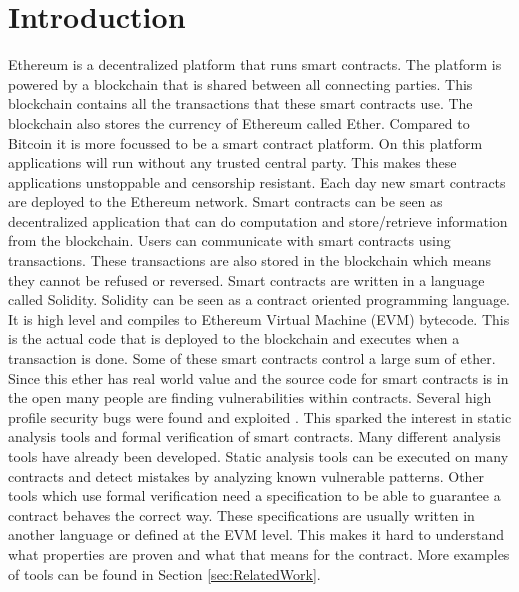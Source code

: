 \documentclass[a4paper]{article}
\begin{document}
\newpage
\tableofcontents
\newpage

\section{Introduction}
Ethereum is a decentralized platform that runs smart contracts. The platform is powered by a blockchain that is shared between all connecting parties. This blockchain contains all the transactions that these smart contracts use. The blockchain also stores the currency of Ethereum called Ether. Compared to Bitcoin it is more focussed to be a smart contract platform. On this platform applications will run without any trusted central party. This makes these applications unstoppable and censorship resistant. Each day new smart contracts are deployed to the Ethereum network. Smart contracts can be seen as decentralized application that can do computation and store/retrieve information from the blockchain. Users can communicate with smart contracts using transactions. These transactions are also stored in the blockchain which means they cannot be refused or reversed. Smart contracts are written in a language called Solidity. Solidity can be seen as a contract oriented programming language. It is high level and compiles to Ethereum Virtual Machine (EVM) bytecode. This is the actual code that is deployed to the blockchain and executes when a transaction is done. Some of these smart contracts control a large sum of ether. Since this ether has real world value and the source code for smart contracts is in the open many people are finding vulnerabilities within contracts. Several high profile security bugs were found and exploited \cite{parity1, parity2,hkg,dao}. This sparked the interest in static analysis tools and formal verification of smart contracts. Many different analysis tools have already been developed. Static analysis tools can be executed on many contracts and detect mistakes by analyzing known vulnerable patterns. Other tools which use formal verification need a specification to be able to guarantee a contract behaves the correct way. These specifications are usually written in another language or defined at the EVM level. This makes it hard to understand what properties are proven and what that means for the contract. More examples of tools can be found in Section \ref{sec:RelatedWork}. 
\end{document}
